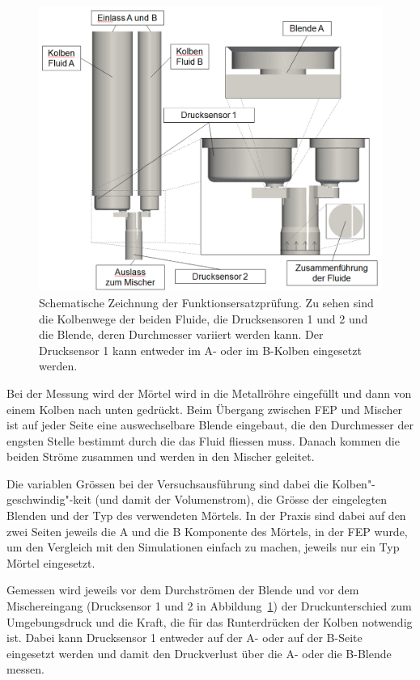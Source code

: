 %
\begin{figure}
    \centering
    \includegraphics[width=\textwidth]{figures/FEP_Schema.png}
    \caption{Schematische Zeichnung der Funktionsersatzprüfung. Zu sehen sind die Kolbenwege der beiden Fluide,
    die Drucksensoren 1 und 2 und die Blende, deren Durchmesser variiert werden kann. Der Drucksensor 1 kann entweder im A- oder im B-Kolben eingesetzt werden.}
    \label{fig:FEP_schema}
\end{figure}

Bei der Messung wird der Mörtel wird in die Metallröhre eingefüllt und dann von einem Kolben nach unten gedrückt. Beim Übergang zwischen FEP und Mischer ist auf jeder Seite eine auswechselbare Blende eingebaut, die den Durchmesser der engsten Stelle bestimmt durch die das Fluid fliessen muss. Danach kommen die beiden Ströme zusammen und werden in den Mischer geleitet.

Die variablen Grössen bei der Versuchsausführung sind dabei die Kolben"-geschwindig"-keit (und damit der Volumenstrom), die Grösse der eingelegten Blenden und der Typ des verwendeten Mörtels. In der Praxis sind dabei auf den zwei Seiten jeweils die A und die B Komponente des Mörtels, in der FEP wurde, um den Vergleich mit den Simulationen einfach zu machen, jeweils nur ein Typ Mörtel eingesetzt.

Gemessen wird jeweils vor dem Durchströmen der Blende und vor dem Mischereingang (Drucksensor 1 und 2 in Abbildung~\ref{fig:FEP_schema}) der Druckunterschied zum Umgebungsdruck und die Kraft, die für das Runterdrücken der Kolben notwendig ist. Dabei kann Drucksensor 1 entweder auf der A- oder auf der B-Seite eingesetzt werden und damit den Druckverlust über die A- oder die B-Blende messen.
%
